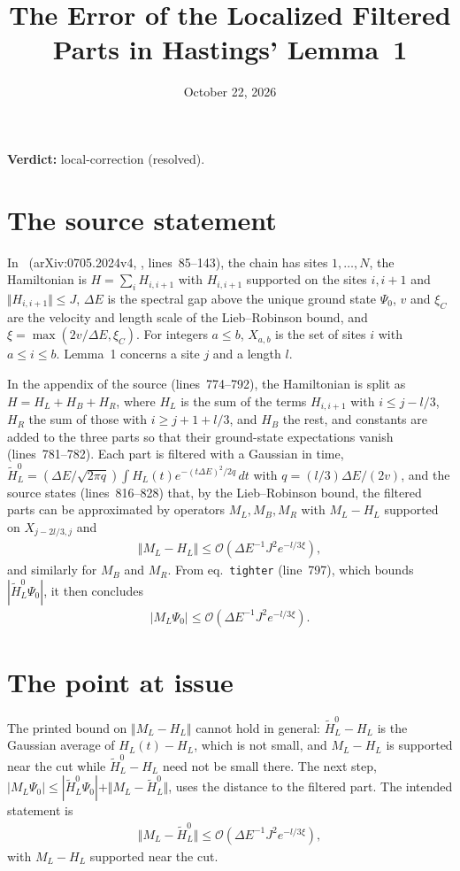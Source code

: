 \documentclass{article}
\title{The Error of the Localized Filtered Parts in Hastings' Lemma~1}
\author{}
\date{October 22, 2026}
\providecommand{\gapnote}[2]{\par\noindent\textbf{Verdict:} #1 (#2).\par}
\begin{document}
\maketitle
\gapnote{local-correction}{resolved}

\section{The source statement}

In~\cite{Hastings2007AreaLaw} (arXiv:0705.2024v4, ,
lines~85--143), the chain has sites $1,\dots,N$, the Hamiltonian is
$H=\sum_iH_{i,i+1}$ with $H_{i,i+1}$ supported on the sites $i,i+1$ and
$\Vert H_{i,i+1}\Vert\le J$, $\Delta E$ is the spectral gap above the unique
ground state $\Psi_0$, $v$ and $\xi_C$ are the velocity and length scale of the
Lieb--Robinson bound, and $\xi=\max(2v/\Delta E,\xi_C)$. For integers $a\le b$,
$X_{a,b}$ is the set of sites $i$ with $a\le i\le b$. Lemma~1 concerns a site
$j$ and a length $l$.

In the appendix of the source (lines~774--792), the Hamiltonian is split as
$H=H_L+H_B+H_R$, where $H_L$ is the sum of the terms $H_{i,i+1}$ with $i\le
j-l/3$, $H_R$ the sum of those with $i\ge j+1+l/3$, and $H_B$ the rest, and constants are added to the three parts so that their
ground-state expectations vanish (lines~781--782). Each
part is filtered with a Gaussian in time,
$\tilde H_L^0=(\Delta E/\sqrt{2\pi q})\int H_L(t)e^{-(t\Delta E)^2/2q}\,dt$
with $q=(l/3)\Delta E/(2v)$, and the source states (lines~816--828) that, by the
Lieb--Robinson bound, the filtered parts can be approximated by operators
$M_L,M_B,M_R$ with $M_L-H_L$ supported on $X_{j-2l/3,j}$ and
\begin{align}
    \Vert M_L-H_L\Vert\le\mathcal O(\Delta E^{-1}J^2e^{-l/3\xi}),
    \label{eq:hastings07_localized_parts_source}
\end{align}
and similarly for $M_B$ and $M_R$. From eq.~\texttt{tighter} (line~797), which bounds
$|\tilde H_L^0\Psi_0|$, it then concludes
\begin{align}
    |M_L\Psi_0|\le\mathcal O(\Delta E^{-1}J^2e^{-l/3\xi}).
    \label{eq:hastings07_localized_parts_ground_state}
\end{align}

\section{The point at issue}

The printed bound on $\Vert M_L-H_L\Vert$ cannot hold in general: $\tilde
H_L^0-H_L$ is the Gaussian average of $H_L(t)-H_L$, which is not small, and
$M_L-H_L$ is supported near the cut while $\tilde H_L^0-H_L$ need not be small
there. The next step, $|M_L\Psi_0|\le|\tilde H_L^0\Psi_0|+\Vert M_L-\tilde
H_L^0\Vert$, uses the distance to the filtered part. The intended statement is
\begin{align}
    \Vert M_L-\tilde H_L^0\Vert\le\mathcal O(\Delta E^{-1}J^2e^{-l/3\xi}),
    \label{eq:hastings07_localized_parts_intended}
\end{align}
with $M_L-H_L$ supported near the cut.
\end{document}
